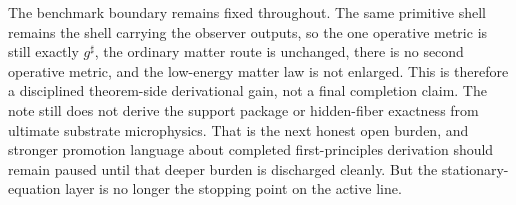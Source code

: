\documentclass[11pt]{article}
\newcommand{\CompletedMetric}{g^{\sharp}}
\begin{document}
The benchmark boundary remains fixed throughout. The same primitive shell remains the shell carrying the observer outputs, so the one operative metric is still exactly \(\CompletedMetric\), the ordinary matter route is unchanged, there is no second operative metric, and the low-energy matter law is not enlarged. This is therefore a disciplined theorem-side derivational gain, not a final completion claim. The note still does not derive the support package or hidden-fiber exactness from ultimate substrate microphysics. That is the next honest open burden, and stronger promotion language about completed first-principles derivation should remain paused until that deeper burden is discharged cleanly. But the stationary-equation layer is no longer the stopping point on the active line.
\end{document}
